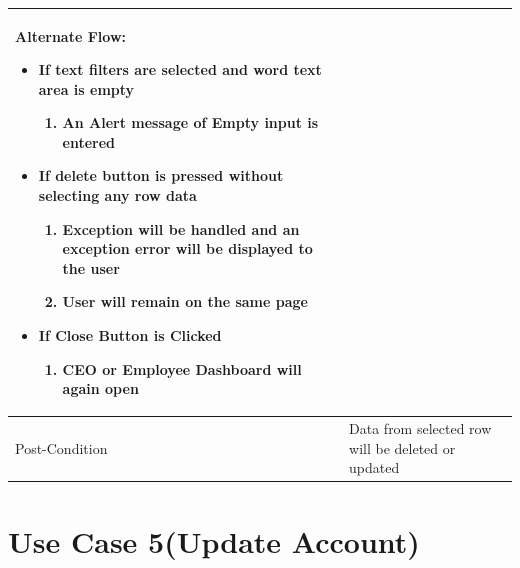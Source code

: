 \documentclass[12pt,a4paper]{report}
\begin{document}
\begin{tabular}{ | m{3cm} | m{12cm}| }
\begin{enumerate}
\end{enumerate}

Alternate Flow:

\begin{itemize}
\item If text filters are selected and word text area is empty
	\begin{enumerate}
		\item 	An Alert message of Empty input is entered
	\end{enumerate}
\item  	If delete button is pressed without selecting any row data
	\begin{enumerate}
		\item 	Exception will be handled and an exception error will be displayed to the user
		\item 	User will remain on the same page 
	\end{enumerate}
\item 	If Close Button is Clicked
	\begin{enumerate}
		\item 	CEO or Employee Dashboard will again open
	\end{enumerate}
\end{itemize}
\\ \hline
Post-Condition &  Data from selected row will be deleted or updated  \\ \hline

\end{tabular}
\section{Use Case 5(Update Account) }
\end{document}
